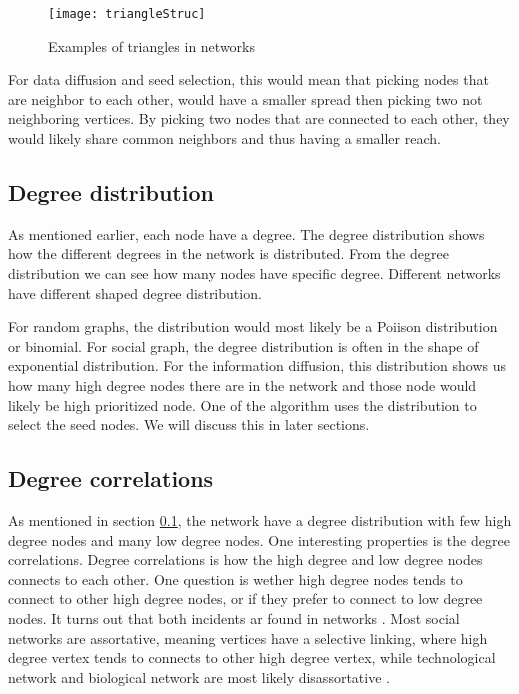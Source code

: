 \begin{figure}
	\texttt{[image: triangleStruc]}
	\caption{Examples of triangles in networks} 
	\label{fig:triangleStruc}
\end{figure}


For data diffusion and seed selection, this would mean that picking nodes that are neighbor to each other, would have a smaller spread then picking two not neighboring vertices. By picking two nodes that are connected to each other, they would likely share common neighbors and thus having a smaller reach.  

\subsection{Degree distribution} \label{degreeDis}
As mentioned earlier, each node have a degree. The degree distribution shows how the different degrees in the network is distributed. From the degree distribution we can see how many nodes have specific degree. Different networks have different shaped degree distribution.

For random graphs, the distribution would most likely be a Poiison distribution or binomial. For social graph, the degree distribution is often in the shape of exponential distribution. For the information diffusion, this distribution shows us how many high degree nodes there are in the network and those node would likely be high prioritized node. One of the algorithm uses the distribution to select the seed nodes. We will discuss this in later sections.  

\subsection{Degree correlations} \label{degreeCorr}
As mentioned in section \ref{degreeDis}, the network have a degree distribution with few high degree nodes and many low degree nodes. One interesting properties is the degree correlations. Degree correlations is how the high degree and low degree nodes connects to each other. One question is wether high degree nodes tends to connect to other high degree nodes, or if they prefer to connect to low degree nodes. It turns out that both incidents ar found in networks \cite{complexNetwork2003}. Most social networks are assortative, meaning vertices have a selective linking, where high degree vertex tends to connects to other high degree vertex, while technological network and biological network are most likely disassortative \cite{AssortativeMixing2002}. 

